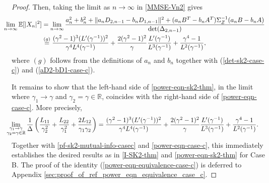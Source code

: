 \documentclass[12pt]{article}
\newcommand{\E}{\mathbb{E}}
\begin{document}
\begin{proof}
Then, taking the limit as $n\to\infty$ in \eqref{MMSE-Vn2} gives
\begin{equation}\label{power-eqn-case-c}
   \hspace{-0.5cm}
   \begin{aligned}
      \lim_{n\to\infty}\E[|X_n|^2] %
      &= \lim_{n\to\infty} \frac{a_n^2 +b_n^2 +\|a_nD_{2,n-1} - b_nD_{1,n-1}  \|^2 +(a_nB^T-b_nA^T)\Sigma_Z^{-1}(a_nB-b_nA)}{\det(\Delta_{2,n-1})}\\
      &\overset{(g)}{=} \frac{(\gamma^2-1)^3(L^\prime(\gamma^{-1}))^2}{\gamma^4 L^4(\gamma^{-1})} + \frac{2(\gamma^2-1)^2}{\gamma}\frac{L^\prime(\gamma^{-1})}{L^3(\gamma^{-1})} +\frac{\gamma^4-1}{L^2(\gamma^{-1})},
   \end{aligned}
\end{equation}
where $(g)$ follows from the definitions of $a_n$ and $b_n$ together with (\ref{det-sk2-case-c}) and (\ref{aD2-bD1-case-c}).



It remains to show that the left-hand side of \eqref{power-eqn-sk2-thm}, in the limit where $\gamma_1\to\gamma$ and $\gamma_2=\gamma\in\mathbb{R}$, coincides with the right-hand side of \eqref{power-eqn-case-c}. More precisely,
\begin{equation}\label{power-eqn-equivalence-case-c}
\hspace*{-0.3cm}
\begin{aligned}
\lim_{\substack{\gamma_1\to\gamma \\ \gamma_2=\gamma\in\mathbb{R}}} \frac{1}{\Delta}\left(\frac{L_{11}}{\gamma_2^2} + \frac{L_{22}}{\gamma_1^2} + \frac{2L_{12}}{\gamma_1\gamma_2}\right) &= \frac{(\gamma^2-1)^3(L^\prime(\gamma^{-1}))^2}{\gamma^4 L^4(\gamma^{-1})} + \frac{2(\gamma^2-1)^2}{\gamma}\frac{L^\prime(\gamma^{-1})}{L^3(\gamma^{-1})}+\frac{\gamma^4-1}{L^2(\gamma^{-1})}.
\end{aligned}
\end{equation}
Together with \eqref{pf-sk2-mutual-info-casec} and \eqref{power-eqn-case-c}, this immediately establishes the desired results as in \eqref{I-SK2-thm} and \eqref{power-eqn-sk2-thm} for Case B. The proof of the identity (\ref{power-eqn-equivalence-case-c}) is deferred to Appendix \ref{sec:proof_of_ref_power_eqn_equivalence_case_c}.
\end{proof}
\end{document}
